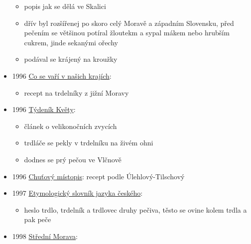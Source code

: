 \begin{itemize}
  \begin{itemize}
  \tightlist
  \item
    popis jak se dělá ve Skalici
  \item
    dřív byl rozšířenej po skoro celý Moravě a západním Slovensku, před
    pečením se většinou potíral žloutekm a sypal mákem nebo hrubším
    cukrem, jinde sekanými ořechy
  \item
    podával se krájený na kroužky
  \end{itemize}
\item
  1996
  \href{https://ceskadigitalniknihovna.cz/view/uuid:f7075980-dd45-11ee-bb18-0050568d319f?page=uuid\%3A38f6bbbd-dd95-47e5-b29c-ef351dec4c15&fulltext=trdeln\%C3\%ADk\%20OR\%20trdeln\%C3\%ADky\%20OR\%20trdeln\%C3\%ADk\%C5\%AF&source=mzk}{Co
  se vaří v našich krajích}:

  \begin{itemize}
  \tightlist
  \item
    recept na trdelníky z jižní Moravy
  \end{itemize}
\item
  1996
  \href{https://ceskadigitalniknihovna.cz/uuid/uuid:df7cfd60-8b4d-11e3-aa9f-5ef3fc9ae867}{Týdeník
  Květy}:

  \begin{itemize}
  \tightlist
  \item
    článek o velikonočních zvycích
  \item
    trdláče se pekly v trdelníku na živém ohni
  \item
    dodnes se prý pečou ve Vlčnově
  \end{itemize}
\item
  1996
  \href{https://ceskadigitalniknihovna.cz/view/uuid:955967f0-58cb-11e8-983f-005056827e51?page=uuid\%3A7daef930-7ef0-11e8-9588-5ef3fc9bb22f&fulltext=trdeln\%C3\%ADk\%20OR\%20trdeln\%C3\%ADky\%20OR\%20trdeln\%C3\%ADk\%C5\%AF&source=nkp}{Chuťový
  místopis}: recept podle Úlehlový-Tilschový
\item
  1997
  \href{https://ceskadigitalniknihovna.cz/view/uuid:df5be160-ef7c-11e2-9923-005056827e52?page=uuid:bba8b2b0-0f12-11e3-9439-005056825209&fulltext=trdlovec&source=nkp}{Etymologický
  slovník jazyka českého}:

  \begin{itemize}
  \tightlist
  \item
    heslo trdlo, trdelník a trdlovec druhy pečiva, těsto se ovine kolem
    trdla a pak peče
  \end{itemize}
\item
  1998
  \href{https://ceskadigitalniknihovna.cz/view/uuid:955967f0-58cb-11e8-983f-005056827e51?page=uuid\%3A7daef930-7ef0-11e8-9588-5ef3fc9bb22f&fulltext=trdeln\%C3\%ADk\%20OR\%20trdeln\%C3\%ADky\%20OR\%20trdeln\%C3\%ADk\%C5\%AF&source=nkp}{Střední
  Morava}:


\end{itemize}
